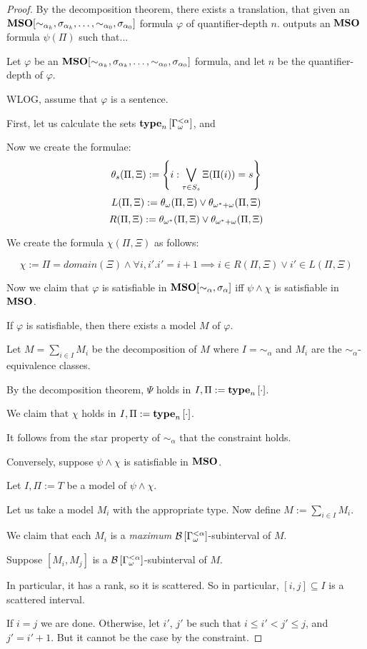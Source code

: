 \begin{proof}
  By the decomposition theorem, there exists a translation,
  that given an $\mathbf{MSO}[\sim_{\alpha_k}, \sigma_{\alpha_k}, \ldots, \sim_{\alpha_0}, \sigma_{\alpha_0}]$ formula $\varphi$ of quantifier-depth $n$.
  outputs an $\mathbf{MSO}$ formula $\psi(\Pi)$ such that...

  Let $\varphi$ be an $\mathbf{MSO}[\sim_{\alpha_k}, \sigma_{\alpha_k}, \ldots, \sim_{\alpha_0}, \sigma_{\alpha_0}]$ formula,
  and let $n$ be the quantifier-depth of $\varphi$.

  WLOG, assume that $\varphi$ is a sentence.

  First, let us calculate the sets
  $\mathbf{type}_{n} \left[ {\Gamma_{\omega}^{< \alpha}} \right]$,
  and 

  Now we create the formulae:
  \[\theta_s(\Pi, \Xi) := \left\{ {i : \bigvee_{\tau \in S_s}{\Xi(\Pi(i)) = s}} \right\}\]
  \[L(\Pi, \Xi) := \theta_{\omega}(\Pi, \Xi) \vee \theta_{\omega^\ast + \omega}(\Pi, \Xi)\]
  \[R(\Pi, \Xi) := \theta_{\omega^\ast}(\Pi, \Xi) \vee \theta_{\omega^\ast + \omega}(\Pi, \Xi)\]

  We create the formula $\chi(\Pi, \Xi)$ as follows:

  \[\chi := \Pi = domain(\Xi) \wedge \forall i, i'. i' = i + 1 \implies {i \in R(\Pi, \Xi) \vee i' \in L(\Pi, \Xi)}\]

  Now we claim that $\varphi$ is satisfiable in $\mathbf{MSO}[\sim_{\alpha}, \sigma_{\alpha}]$
  iff $\psi \land \chi$ is satisfiable in $\mathbf{MSO}$.

  If $\varphi$ is satisfiable, then there exists a model $M$ of $\varphi$.

  Let $M = \sum_{i \in I} M_i$ be the decomposition of $M$
  where $I = \sim_{\alpha}$ and $M_i$ are the $\sim_{\alpha}$-equivalence classes.

  By the decomposition theorem, $\Psi$ holds
  in $I, \Pi := \mathbf{type}_{n} \left[ {\cdot} \right]$.

  We claim that $\chi$ holds in $I, \Pi := \mathbf{type}_{n} \left[ {\cdot} \right]$.

  It follows from the star property of $\sim_{\alpha}$ that the constraint holds.

  Conversely, suppose $\psi \land \chi$ is satisfiable in $\mathbf{MSO}$.

  Let $I, \Pi := T$ be a model of $\psi \land \chi$.

  Let us take a model $M_i$ with the appropriate type.
  Now define $M := \sum_{i \in I} M_i$.

  We claim that each $M_i$ is a \emph{maximum} $\mathcal{B} \left[ {{\Gamma_{\omega}^{< \alpha}}} \right]$-subinterval
  of $M$.

  Suppose $[M_i, M_j]$ is a $\mathcal{B} \left[ {{\Gamma_{\omega}^{< \alpha}}} \right]$-subinterval of $M$.

  In particular, it has a rank, so it is scattered. So in particular,
  $[i, j] \subseteq I$ is a scattered interval.

  If $i = j$ we are done. Otherwise, let $i'$, $j'$ be such that $i \le i' < j' \le j$,
  and $j' = i' + 1$.  But it cannot be the case by the constraint.

\end{proof}
